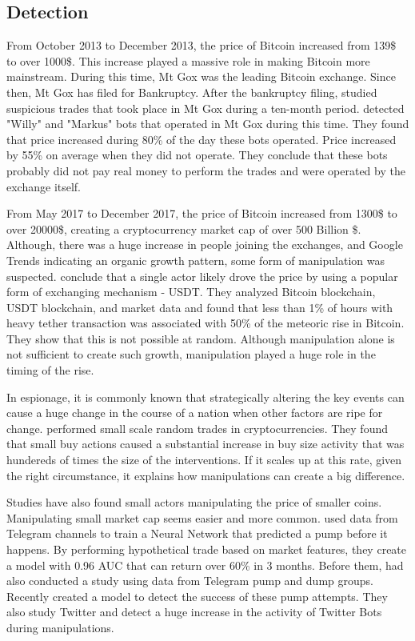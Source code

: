 \documentclass[letterpaper]{article}
\begin{document}
\subsection{Detection}
From October 2013 to December 2013, the price of Bitcoin increased from 139\$ to over 1000\$. This
increase played a massive role in making Bitcoin more mainstream. During 
this time, Mt Gox was the leading Bitcoin exchange. Since then, Mt Gox has filed for Bankruptcy. After the bankruptcy
filing, \cite{gandal2018price} studied suspicious trades that took place in Mt Gox
during a ten-month period. \cite{gandal2018price} detected "Willy" and "Markus" bots that operated in Mt Gox
during this time. They found that price increased during 80\% of the day these bots operated. Price increased 
by 55\% on average when they did not operate. They conclude that these bots probably did not pay real money to perform the 
trades and were operated by the exchange itself. \par

From May 2017 to December 2017, the price of Bitcoin increased from 1300\$ to over 20000\$, creating a cryptocurrency
market cap of over 500 Billion \$. Although, there was a huge increase in people joining the exchanges, and 
Google Trends indicating an organic growth pattern, some form of manipulation was suspected. \cite{griffin2019bitcoin} 
conclude that a single actor likely drove the price by using a popular form of exchanging mechanism - USDT. They 
analyzed Bitcoin blockchain, USDT blockchain, and market data and found that less than 1\% of hours with heavy tether
transaction was associated with 50\% of the meteoric rise in Bitcoin. They show that this is not possible at random.
Although manipulation alone is not sufficient to create such growth, manipulation played a huge 
role in the timing of the rise. \par

In espionage, it is commonly known that strategically altering the key events can cause a huge change 
in the course of a nation when other factors are ripe for change. \cite{krafft2018experimental} performed small 
scale random trades in 
cryptocurrencies. They found that small buy actions caused a substantial increase in buy size activity that was 
hundereds of times the size of the interventions. If it scales up at this rate, given the right circumstance,
it explains how manipulations can create a big difference. \par

Studies have also found small actors manipulating the price of smaller coins. Manipulating small market cap 
seems easier and more common. \cite{xu2019anatomy} used data from 
Telegram channels to train a Neural Network that predicted a pump before it happens. By performing hypothetical
trade based on market features, they create a model with 0.96 AUC that can return over 60\% in 3 months.
Before them, \cite{li2019cryptocurrency} had also conducted a study using data from Telegram pump and dump groups. 
Recently \cite{mirtaheri2019identifying}
 created a model to detect the success of these pump attempts. They also study Twitter and detect a huge increase in 
the activity of Twitter Bots during manipulations. \par
\end{document}
